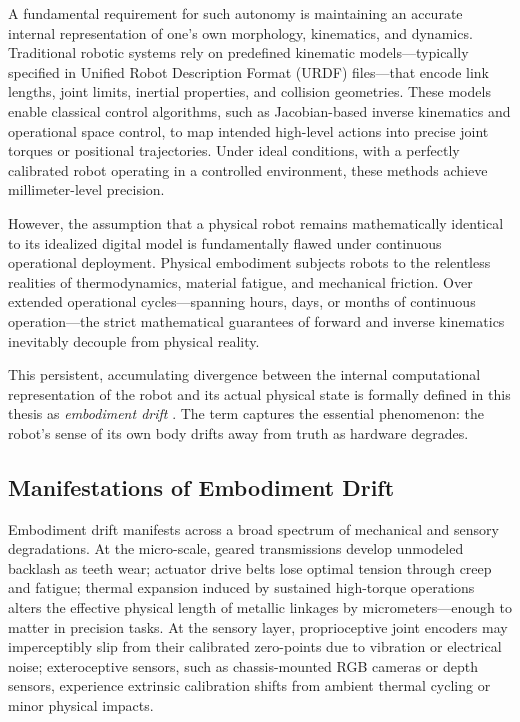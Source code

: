 ﻿\documentclass[12pt,a4paper,oneside]{report}
\begin{document}
A fundamental requirement for such autonomy is maintaining an accurate internal representation of one's own morphology, kinematics, and dynamics. Traditional robotic systems rely on predefined kinematic models---typically specified in Unified Robot Description Format (URDF) files---that encode link lengths, joint limits, inertial properties, and collision geometries. These models enable classical control algorithms, such as Jacobian-based inverse kinematics and operational space control, to map intended high-level actions into precise joint torques or positional trajectories. Under ideal conditions, with a perfectly calibrated robot operating in a controlled environment, these methods achieve millimeter-level precision.

However, the assumption that a physical robot remains mathematically identical to its idealized digital model is fundamentally flawed under continuous operational deployment. Physical embodiment subjects robots to the relentless realities of thermodynamics, material fatigue, and mechanical friction. Over extended operational cycles---spanning hours, days, or months of continuous operation---the strict mathematical guarantees of forward and inverse kinematics inevitably decouple from physical reality.

This persistent, accumulating divergence between the internal computational representation of the robot and its actual physical state is formally defined in this thesis as \textit{embodiment drift} \cite{bongard2006resilient, kwiatkowski2019task}. The term captures the essential phenomenon: the robot's sense of its own body drifts away from truth as hardware degrades.

\subsection{Manifestations of Embodiment Drift}

Embodiment drift manifests across a broad spectrum of mechanical and sensory degradations. At the micro-scale, geared transmissions develop unmodeled backlash as teeth wear; actuator drive belts lose optimal tension through creep and fatigue; thermal expansion induced by sustained high-torque operations alters the effective physical length of metallic linkages by micrometers---enough to matter in precision tasks. At the sensory layer, proprioceptive joint encoders may imperceptibly slip from their calibrated zero-points due to vibration or electrical noise; exteroceptive sensors, such as chassis-mounted RGB cameras or depth sensors, experience extrinsic calibration shifts from ambient thermal cycling or minor physical impacts.
\end{document}
